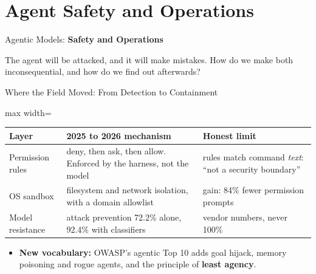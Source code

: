 \section{Agent Safety and Operations}

\begin{frame}{}
    \LARGE Agentic Models: \textbf{Safety and Operations}

    \vspace{1em}
    \normalsize The agent will be attacked, and it will make mistakes. How do we make both inconsequential, and how do we find out afterwards?
\end{frame}

\begin{frame}{Where the Field Moved: From Detection to Containment}
    \begin{center}
    \small
    \renewcommand{\arraystretch}{1.25}
    \begin{adjustbox}{max width=\linewidth}\begin{tabular}{>{\raggedright\arraybackslash}p{2.7cm}>{\raggedright\arraybackslash}p{5.6cm}>{\raggedright\arraybackslash}p{4.6cm}}
        \toprule
        \textbf{Layer} & \textbf{2025 to 2026 mechanism} & \textbf{Honest limit} \\
        \midrule
        Permission rules & deny, then ask, then allow. Enforced by the harness, not the model & rules match command \emph{text}: ``not a security boundary'' \\
        OS sandbox & filesystem and network isolation, with a domain allowlist & gain: 84\% fewer permission prompts \\
        Model resistance & attack prevention 72.2\% alone, 92.4\% with classifiers & vendor numbers, never 100\% \\
        \bottomrule
    \end{tabular}\end{adjustbox}
    \end{center}
    \begin{itemize}
        \item \textbf{New vocabulary:} OWASP's agentic Top 10 adds goal hijack, memory poisoning and rogue agents, and the principle of \textbf{least agency}.
    \end{itemize}
\end{frame}

